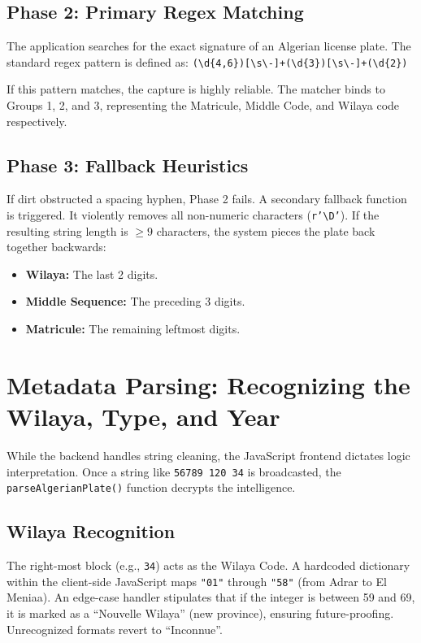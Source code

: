 \documentclass[conference]{IEEEtran}
\begin{document}
\subsection{Phase 2: Primary Regex Matching}
The application searches for the exact signature of an Algerian license plate. The standard regex pattern is defined as:
\texttt{(\textbackslash d\{4,6\})[\textbackslash s\textbackslash-]+(\textbackslash d\{3\})[\textbackslash s\textbackslash-]+(\textbackslash d\{2\})}

If this pattern matches, the capture is highly reliable. The matcher binds to Groups 1, 2, and 3, representing the Matricule, Middle Code, and Wilaya code respectively. 

\subsection{Phase 3: Fallback Heuristics}
If dirt obstructed a spacing hyphen, Phase 2 fails. A secondary fallback function is triggered. It violently removes all non-numeric characters (\texttt{r'\textbackslash D'}). If the resulting string length is $\ge 9$ characters, the system pieces the plate back together backwards:
\begin{itemize}
    \item \textbf{Wilaya:} The last 2 digits.
    \item \textbf{Middle Sequence:} The preceding 3 digits.
    \item \textbf{Matricule:} The remaining leftmost digits.
\end{itemize}

\section{Metadata Parsing: Recognizing the Wilaya, Type, and Year}
While the backend handles string cleaning, the JavaScript frontend dictates logic interpretation. Once a string like \texttt{56789 120 34} is broadcasted, the \texttt{parseAlgerianPlate()} function decrypts the intelligence.

\subsection{Wilaya Recognition}
The right-most block (e.g., \texttt{34}) acts as the Wilaya Code. A hardcoded dictionary within the client-side JavaScript maps \texttt{"01"} through \texttt{"58"} (from Adrar to El Meniaa). 
An edge-case handler stipulates that if the integer is between 59 and 69, it is marked as a ``Nouvelle Wilaya'' (new province), ensuring future-proofing. Unrecognized formats revert to ``Inconnue''.
\end{document}
